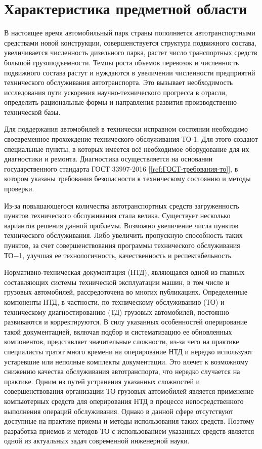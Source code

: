 \section{Характеристика предметной области}
В настоящее время автомобильный парк страны пополняется автотранспортными
средствами новой конструкции, совершенствуется структура подвижного состава,
увеличивается численность дизельного парка, растет число транспортных средств
большой грузоподъемности. Темпы роста объемов перевозок и численность подвижного
состава растут и нуждаются в увеличении численности предприятий технического
обслуживания автотранспорта. Это вызывает необходимость исследования пути
ускорения научно-технического прогресса в отрасли, определить рациональные формы
и направления развития производственно-технической базы.

Для поддержания автомобилей в технически исправном состоянии необходимо
своевременное прохождение технического обслуживания ТО-1. Для этого создают
специальные пункты, в которых имеется всё необходимое оборудование для их
диагностики и ремонта. Диагностика осуществляется на основании государственного
стандарта ГОСТ 33997-2016 [\ref{ref:ГОСТ-требования-то}], в котором указаны
требования безопасности к техническому состоянию и методы проверки.

Из-за повышающегося количества автотранспортных средств загруженность пунктов
технического обслуживания стала велика. Существует несколько вариантов решения
данной проблемы. Возможно увеличение числа пунктов технического обслуживания.
Либо увеличить пропускную способность таких пунктов, за счет совершенствования
программы технического обслуживания ТО−1, улучшая ее технологичность,
качественность и респектабельность.

Нормативно-техническая документация (НТД), являющаяся одной из главных
составляющих системы технической эксплуатации машин, в том числе и грузовых
автомобилей, рассредоточена во многих публикациях. Определенные компоненты НТД,
в частности, по техническому обслуживанию (ТО) и техническому диагностированию
(ТД) грузовых автомобилей, постоянно развиваются и корректируются.
В силу указанных особенностей оперирование такой документацией,
включая подбор и систематизацию ее обновленных компонентов, представляет
значительные сложности, из-за чего на практике специалисты тратят много времени
на оперирование НТД и нередко используют устаревшие или неполные комплекты
документации. Это влечет к возможному снижению качества обслуживания
автотранспорта, что нередко случается на практике.
Одним из путей устранения указанных сложностей и совершенствования организации
ТО грузовых автомобилей является применение компьютерных средств для
оперирования НТД в процессе непосредственного выполнения операций обслуживания.
Однако в данной сфере отсутствуют доступные на практике приемы и методы
использования таких средств. Поэтому разработка приемов и методов ТО с
использованием указанных средств является одной из актуальных задач современной
инженерной науки.

